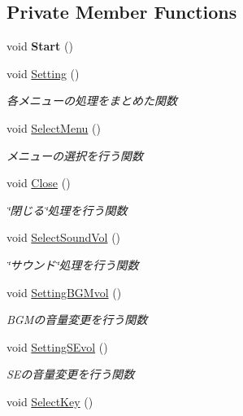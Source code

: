 \subsection*{Private Member Functions}
\begin{DoxyCompactItemize}
\item 
\mbox{\label{class_config_a9657d1d6b1cf0bd69f07dfc95a20902d}} 
void {\bfseries Start} ()
\item 
void \hyperlink{class_config_ab74559087b49ddc68683cee83e60be25}{Setting} ()
\begin{DoxyCompactList}\small\item\em 各メニューの処理をまとめた関数 \end{DoxyCompactList}\item 
void \hyperlink{class_config_af831e43ea181c0244cf91ceaaddb112d}{Select\+Menu} ()
\begin{DoxyCompactList}\small\item\em メニューの選択を行う関数 \end{DoxyCompactList}\item 
void \hyperlink{class_config_a7a5cdf495c53a17595d439527813abb3}{Close} ()
\begin{DoxyCompactList}\small\item\em \char`\"{}閉じる\char`\"{}処理を行う関数 \end{DoxyCompactList}\item 
void \hyperlink{class_config_a046e51367235ce55f4de31f43022b9c6}{Select\+Sound\+Vol} ()
\begin{DoxyCompactList}\small\item\em \char`\"{}サウンド\char`\"{}処理を行う関数 \end{DoxyCompactList}\item 
void \hyperlink{class_config_a129efe0f7194ef8eb9c27a94752ff2b7}{Setting\+B\+G\+Mvol} ()
\begin{DoxyCompactList}\small\item\em B\+G\+Mの音量変更を行う関数 \end{DoxyCompactList}\item 
void \hyperlink{class_config_a8a5015567d30dd61658de82526286301}{Setting\+S\+Evol} ()
\begin{DoxyCompactList}\small\item\em S\+Eの音量変更を行う関数 \end{DoxyCompactList}\item 
void \hyperlink{class_config_a39b12148009099d6797eefdf491e57f2}{Select\+Key} ()

\end{DoxyCompactItemize}
